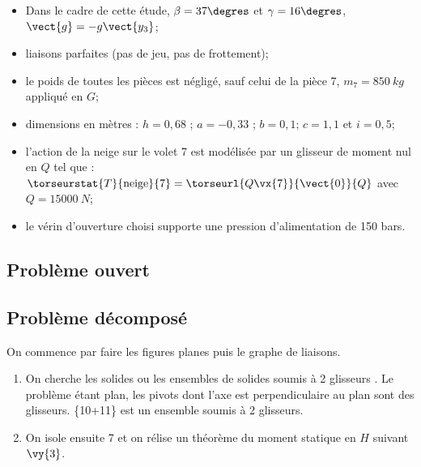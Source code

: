 \begin{itemize}
\item Dans le cadre de cette étude, $\beta = 37\degres$ et $\gamma = 16\degres$, $\vect{g}=-g\vect{y_3}$;
\item liaisons parfaites (pas de jeu, pas de frottement);
\item le poids de toutes les pièces est négligé, sauf celui de la pièce 7, $m_7=\SI{850}{kg}$ appliqué en $G$;
\item dimensions en mètres :  $h=0,68$ ; $a=-0,33$ ; $b=0,1$; $c=1,1$ et $i=0,5$;
\item l’action de la neige sur le volet 7 est modélisée par un glisseur de moment nul en $Q$ tel que :
$\torseurstat{T}{\text{neige}}{7} =  \torseurl{Q\vx{7}}{\vect{0}}{Q}$ avec $Q = \SI{15000}{N}$;
\item le vérin d’ouverture choisi supporte une pression d'alimentation de 150 bars.
\end{itemize}


\subsection*{Problème ouvert}


\subsection*{Problème décomposé}







\ifprof
On commence par faire les figures planes puis le graphe de liaisons.
\begin{enumerate}
\item On cherche les solides ou les ensembles de solides soumis à 2 glisseurs . Le problème étant plan, les pivots dont l'axe est perpendiculaire au plan sont des glisseurs. \{10+11\} est un ensemble soumis à 2 glisseurs.
\item On isole ensuite 7 et on rélise un théorème du moment statique en $H$ suivant $\vy{3}$.
\end{enumerate}

